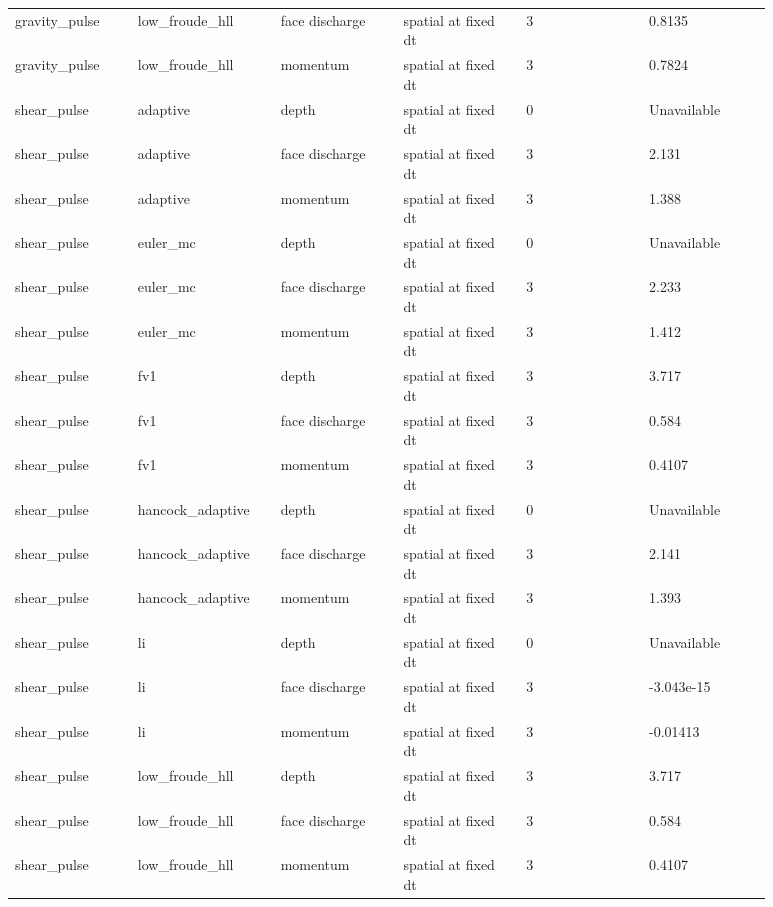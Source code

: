 \begin{longtable}{p{0.1467\linewidth}p{0.1467\linewidth}p{0.1467\linewidth}p{0.1467\linewidth}p{0.1467\linewidth}p{0.1467\linewidth}}
gravity\_pulse & low\_froude\_hll & face discharge & spatial at fixed dt & 3 & 0.8135 \\
gravity\_pulse & low\_froude\_hll & momentum & spatial at fixed dt & 3 & 0.7824 \\
shear\_pulse & adaptive & depth & spatial at fixed dt & 0 & Unavailable \\
shear\_pulse & adaptive & face discharge & spatial at fixed dt & 3 & 2.131 \\
shear\_pulse & adaptive & momentum & spatial at fixed dt & 3 & 1.388 \\
shear\_pulse & euler\_mc & depth & spatial at fixed dt & 0 & Unavailable \\
shear\_pulse & euler\_mc & face discharge & spatial at fixed dt & 3 & 2.233 \\
shear\_pulse & euler\_mc & momentum & spatial at fixed dt & 3 & 1.412 \\
shear\_pulse & fv1 & depth & spatial at fixed dt & 3 & 3.717 \\
shear\_pulse & fv1 & face discharge & spatial at fixed dt & 3 & 0.584 \\
shear\_pulse & fv1 & momentum & spatial at fixed dt & 3 & 0.4107 \\
shear\_pulse & hancock\_adaptive & depth & spatial at fixed dt & 0 & Unavailable \\
shear\_pulse & hancock\_adaptive & face discharge & spatial at fixed dt & 3 & 2.141 \\
shear\_pulse & hancock\_adaptive & momentum & spatial at fixed dt & 3 & 1.393 \\
shear\_pulse & li & depth & spatial at fixed dt & 0 & Unavailable \\
shear\_pulse & li & face discharge & spatial at fixed dt & 3 & -3.043e-15 \\
shear\_pulse & li & momentum & spatial at fixed dt & 3 & -0.01413 \\
shear\_pulse & low\_froude\_hll & depth & spatial at fixed dt & 3 & 3.717 \\
shear\_pulse & low\_froude\_hll & face discharge & spatial at fixed dt & 3 & 0.584 \\
shear\_pulse & low\_froude\_hll & momentum & spatial at fixed dt & 3 & 0.4107 \\
\end{longtable}
\endgroup
